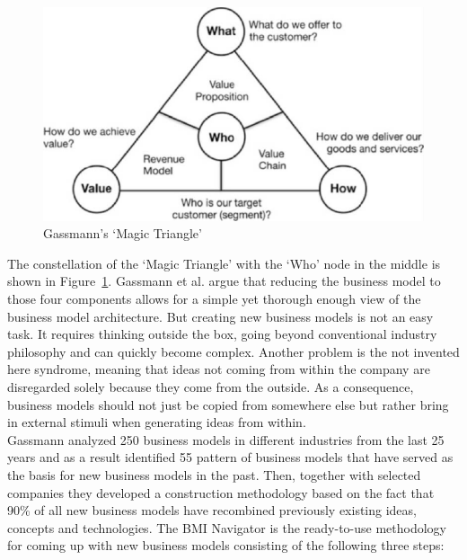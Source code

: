 		\begin{figure}[ht]
		    \begin{center}
		    \includegraphics[scale=1.25]{Talk11/gassmann_triangle.pdf}
		    \end{center}
		    \caption{Gassmann's `Magic Triangle' \cite{gassmann55}}
		    \label{fig:m_triangle}
		\end{figure}
		The constellation of the `Magic Triangle' with the `Who' node in the middle is shown in Figure~\ref{fig:m_triangle}. Gassmann et al. argue that reducing the business model to those four components allows for a simple yet thorough enough view of the business model architecture. But creating new business models is not an easy task. It requires thinking outside the box, going beyond conventional industry philosophy and can quickly become complex. Another problem is the not invented here syndrome, meaning that ideas not coming from within the company are disregarded solely because they come from the outside. As a consequence, business models should not just be copied from somewhere else but rather bring in external stimuli when generating ideas from within.\\
		Gassmann analyzed 250 business models in different industries from the last 25 years and as a result identified 55 pattern of business models that have served as the basis for new business models in the past. Then, together with selected companies they developed a construction methodology based on the fact that 90\% of all new business models have recombined previously existing ideas, concepts and  technologies. The BMI Navigator is the ready-to-use methodology for coming up with new business models consisting of the following three steps:
		\vspace{-1em}

